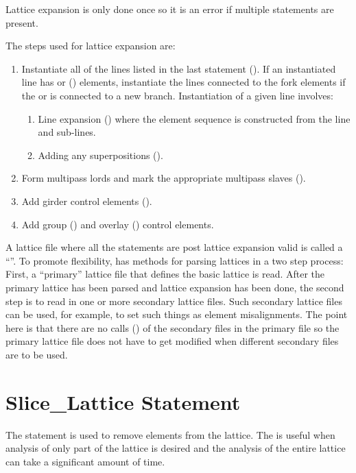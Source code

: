 {{{Lattice expansion is only done once so it is an error if multiple
 statements are present.

The steps used for lattice expansion are:
\begin{enumerate}
\item
Instantiate all of the lines listed in the last  statement (). If an instantiated line has
 or  () elements, instantiate the lines connected to the fork
elements if the  or  is connected to a new branch. Instantiation of a given
line involves:
\begin{enumerate}
\item
Line expansion () where the element sequence is constructed from the line and sub-lines.
\item
Adding any superpositions ().
\end{enumerate}
\item
Form multipass lords and mark the appropriate multipass slaves ().
\item
Add girder control elements ().
\item
Add group () and overlay () control elements.
\end{enumerate}

A lattice file where all the statements are post lattice expansion valid is called a ``''.  To promote flexibility, \bmad has methods for parsing lattices in a two step
process: First, a ``primary'' lattice file that defines the basic lattice is read. After the primary
lattice has been parsed and lattice expansion has been done, the second step is to read in one or
more secondary lattice files. Such secondary lattice files can be used, for example, to set such
things as element misalignments. The point here is that there are no calls () of the
secondary files in the primary file so the primary lattice file does not have to get modified when
different secondary files are to be used.

\section{Slice_Lattice Statement}

The  statement is used to remove elements from the lattice. The 
is useful when analysis of only part of the lattice is desired and the analysis of the entire
lattice can take a significant amount of time.

}}}
